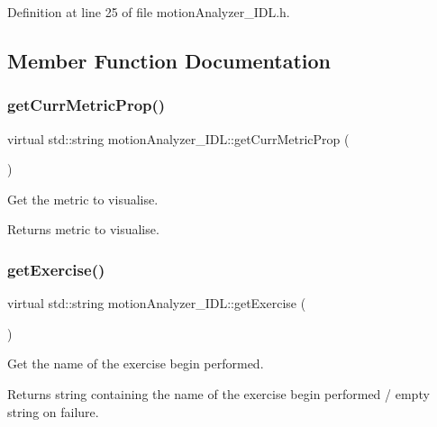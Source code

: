Definition at line 25 of file motion\+Analyzer\+\_\+\+I\+D\+L.\+h.



\subsection{Member Function Documentation}
\mbox{\label{classmotionAnalyzer__IDL_a2caac2fd16a9abd91b59615dbb717c88}} 
\subsubsection{\texorpdfstring{get\+Curr\+Metric\+Prop()}{getCurrMetricProp()}}
{\footnotesize\ttfamily virtual std\+::string motion\+Analyzer\+\_\+\+I\+D\+L\+::get\+Curr\+Metric\+Prop (\begin{DoxyParamCaption}{ }\end{DoxyParamCaption})\hspace{0.3cm}{\ttfamily [virtual]}}



Get the metric to visualise. 

\begin{DoxyReturn}{Returns}
metric to visualise. 
\end{DoxyReturn}
\mbox{\label{classmotionAnalyzer__IDL_a7e2b015cc7bd121d789e33980505f630}} 
\subsubsection{\texorpdfstring{get\+Exercise()}{getExercise()}}
{\footnotesize\ttfamily virtual std\+::string motion\+Analyzer\+\_\+\+I\+D\+L\+::get\+Exercise (\begin{DoxyParamCaption}{ }\end{DoxyParamCaption})\hspace{0.3cm}{\ttfamily [virtual]}}



Get the name of the exercise begin performed. 

\begin{DoxyReturn}{Returns}
string containing the name of the exercise begin performed / empty string on failure. 
\end{DoxyReturn}
\mbox{\label{classmotionAnalyzer__IDL_ab7f4dca083dfc447fdefea7760b95c43}} 
